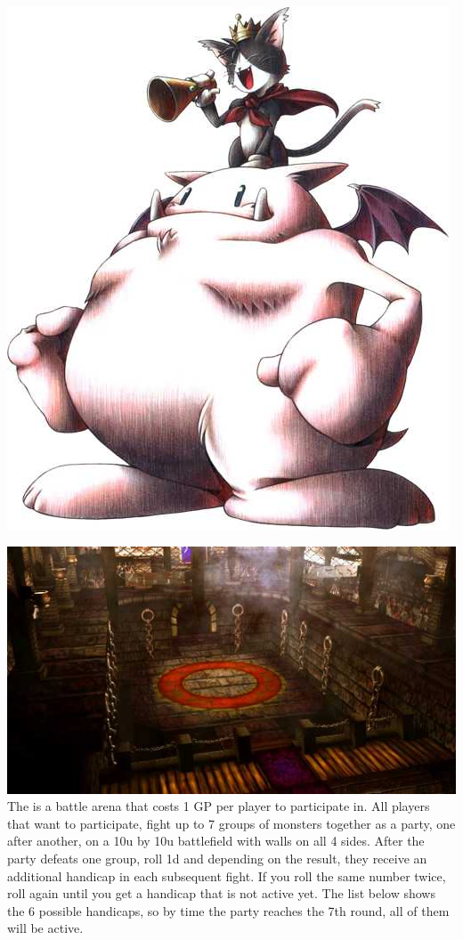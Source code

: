 {
\begin{center}\includegraphics[width=0.7\columnwidth]{./art/goldsaucer/caitsith.jpg}\end{center}
%
%
%
%
\newpage
%
\includegraphics[width=\columnwidth]{./art/goldsaucer/arena.jpg}
%
\vfill
%
The  is a battle arena that costs 1 GP per player to participate in.
All players that want to participate, fight up to 7 groups of monsters together as a party, one after another, on a 10u by 10u battlefield with walls on all 4 sides.
After the party defeats one group, roll 1d and depending on the result, they receive an additional handicap in each subsequent fight.
If you roll the same number twice, roll again until you get a handicap that is not active yet.
The list below shows the 6 possible handicaps, so by time the party reaches the 7th round, all of them will be active.
%
}

